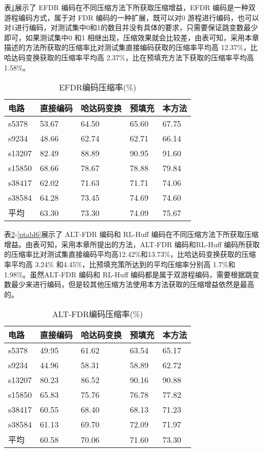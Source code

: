 表\ref{ptabl4}展示了 EFDR 编码在不同压缩方法下所获取压缩增益，EFDR 编码是一种双游程编码方式，属于对 FDR 编码的一种扩展，既可以对0 游程进行编码，也可以对1进行编码，对测试集中0和1的数目并没有具体的要求，只需要保证跳变数最少即可，如果测试集中0 和1 相继出现，压缩效果就会比较差，由表可知，采用本章描述的方法所获取的压缩率比对测试集直接编码获取的压缩率平均高 12.37\%，比哈达码变换获取的压缩率平均高 2.37\%，比在预填充方法下获取的压缩率平均高 1.58\%。

\begin{table}[H]
\centering
\caption{EFDR编码压缩率(\%)}\label{ptabl4}
\begin{tabular}{p{2.2cm}p{2.7cm}<{\centering}p{3.3cm}<{\centering}p{2.7cm}<{\centering}p{2.7cm}<{\centering}}
\toprule
\textbf{电路}&	\textbf{直接编码}& \textbf{哈达码变换}& \textbf{预填充}& \textbf{本方法}\\
\midrule
s5378&	53.67&	64.50&	65.60&	67.75\\
s9234&	48.66&	62.74&	62.71&	66.14\\
s13207&	82.49&	88.89&	90.95&	91.60\\
s15850&	68.66&	78.67&	78.88&	79.84\\
s38417&	62.02&	71.63&	71.71&	74.06\\
s38584&	64.28&	73.45&	74.69&	74.60\\
平均&	63.30&	73.30&	74.09&	75.67\\
\bottomrule
\end{tabular}
\end{table}

表\ref{ptabl5}-\ref{ptabl6}展示了 ALT-FDR 编码和 RL-Huff 编码在不同压缩方法下所获取压缩增益。由表可知，采用本章所提出的方法，ALT-FDR 编码和RL-Huff 编码所获取的压缩率比对测试集直接编码平均高12.42\%和13.73\%，比哈达码变换获取的压缩率平均高 3.24\% 和4.45\%，比预填充策所达到的平均压缩率分别高 1.7\%和 1.98\%。虽然ALT-FDR 编码和 RL-Huff 编码都是属于双游程编码，需要根据跳变数最少来进行编码，但是较其他压缩方法使用本方法获取的压缩增益依然是最高的。

\begin{table}[H]
\centering
\caption{ALT-FDR编码压缩率(\%)}\label{ptabl5}
\begin{tabular}{p{2.2cm}p{2.7cm}<{\centering}p{3.3cm}<{\centering}p{2.7cm}<{\centering}p{2.7cm}<{\centering}}
\toprule
\textbf{电路}&	\textbf{直接编码}& \textbf{哈达码变换}& \textbf{预填充}& \textbf{本方法}\\
\midrule
s5378&	49.95&	61.62&	63.54&	65.17\\
s9234&	44.96&	58.31&	58.89&	62.72\\
s13207&	80.23&	86.52&	90.16&	90.88\\
s15850&	65.83&	75.76&	76.78&	77.82\\
s38417&	60.55&	68.40&	68.13&	71.23\\
s38584&	61.13&	69.70&	72.09&	71.97\\
平均&	60.58&	70.06&	71.60&	73.30\\
\bottomrule
\end{tabular}
\end{table}

